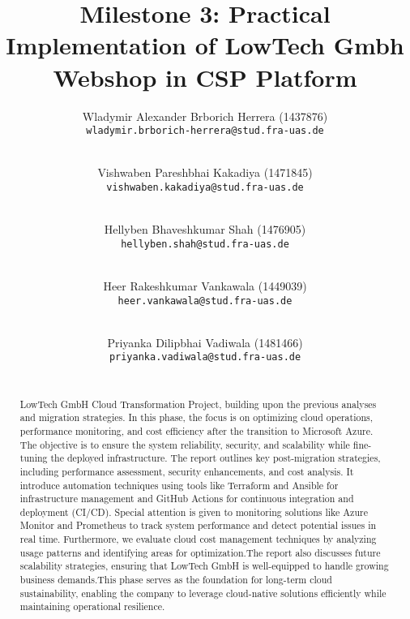\documentclass{llncs}
\newcommand{\what}{Milestone 3: Practical Implementation of LowTech Gmbh Webshop in CSP Platform}
\begin{document}
%
%
%
\mainmatter              %
%
\title{\what}
%
\author{
    Wladymir Alexander Brborich Herrera (1437876)\\
    \texttt{wladymir.brborich-herrera@stud.fra-uas.de}
    \and\\
    Vishwaben Pareshbhai Kakadiya (1471845)\\
    \texttt{vishwaben.kakadiya@stud.fra-uas.de}
    \and\\
    Hellyben Bhaveshkumar Shah (1476905)\\
    \texttt{hellyben.shah@stud.fra-uas.de}
    \and\\
    Heer Rakeshkumar Vankawala (1449039)
    \\
    \texttt{heer.vankawala@stud.fra-uas.de}
    \and\\
    Priyanka Dilipbhai Vadiwala (1481466)\\
    \texttt{priyanka.vadiwala@stud.fra-uas.de}
}
%

\maketitle              %


\begin{abstract}

    \\LowTech GmbH Cloud Transformation Project, building upon the previous analyses and migration strategies. In this phase, 
    the focus is on optimizing cloud operations, performance monitoring, and cost efficiency after the transition to Microsoft
    Azure. The objective is to ensure the system reliability, security, and scalability while fine-tuning the deployed infrastructure.
    The report outlines key post-migration strategies, including performance assessment, security enhancements, and cost analysis. 
    It introduce automation techniques using tools like Terraform and Ansible for infrastructure management and GitHub Actions for 
    continuous integration and deployment (CI/CD). Special attention is given to monitoring solutions like Azure Monitor and Prometheus
    to track system performance and detect potential issues in real time. Furthermore, we evaluate cloud cost management techniques by 
    analyzing usage patterns and identifying areas for optimization.The report also discusses future scalability strategies,
    ensuring that LowTech GmbH is well-equipped to handle growing business demands.This phase serves as the foundation for long-term 
    cloud sustainability, enabling the company to leverage cloud-native solutions efficiently while maintaining operational resilience.

\end{abstract}
\end{document}
